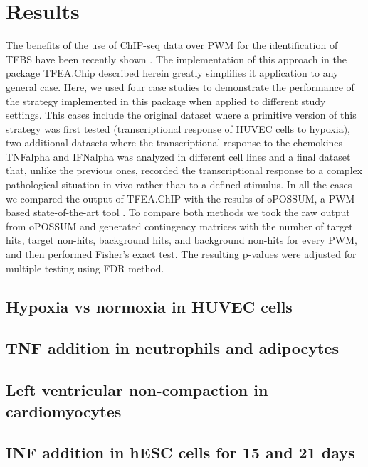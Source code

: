 \documentclass[10pt,letterpaper]{article}
\begin{document}
\section*{Results}
The benefits of the use of ChIP-seq data over PWM for the identification of TFBS have been recently shown \cite{Tiana2018a}. The implementation of this approach in the package TFEA.Chip described herein greatly simplifies it application to any general case. Here, we used four case studies to demonstrate the performance of the strategy implemented in this package when applied to different study settings. This cases include the original dataset where a primitive version of this strategy was first tested (transcriptional response of HUVEC cells to hypoxia), two additional datasets where the transcriptional response to the chemokines TNFalpha and IFNalpha was analyzed in different cell lines and a final dataset that, unlike the previous ones, recorded the transcriptional response to a complex pathological situation in vivo rather than to a defined stimulus. In all the cases we compared the output of TFEA.ChIP with the results of oPOSSUM, a PWM-based state-of-the-art tool \cite{Kwon2012}. To compare both methods we took the raw output from oPOSSUM and generated contingency matrices with the number of target hits, target non-hits, background hits, and background non-hits for every PWM, and then performed Fisher’s exact test. The resulting p-values were adjusted for multiple testing using FDR method.

\subsection{Hypoxia vs normoxia in HUVEC cells}

\subsection{TNF addition in neutrophils and adipocytes}

\subsection{Left ventricular non-compaction in cardiomyocytes}

\subsection{INF addition in hESC cells for 15 and 21 days}
\end{document}
